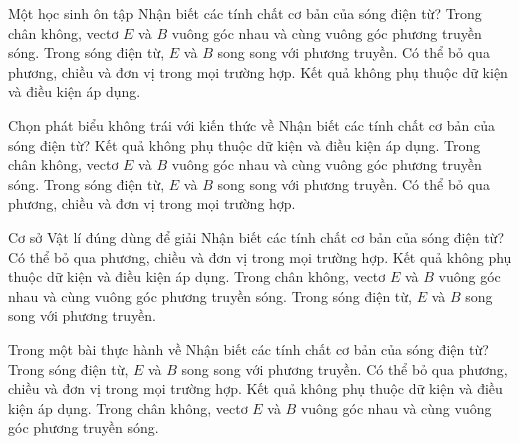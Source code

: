 \begin{ex}
Một học sinh ôn tập Nhận biết các tính chất cơ bản của sóng điện từ?
\choice
{\True Trong chân không, vectơ $E$ và $B$ vuông góc nhau và cùng vuông góc phương truyền sóng.}
{Trong sóng điện từ, $E$ và $B$ song song với phương truyền.}
{Có thể bỏ qua phương, chiều và đơn vị trong mọi trường hợp.}
{Kết quả không phụ thuộc dữ kiện và điều kiện áp dụng.}
\end{ex}

\begin{ex}
Chọn phát biểu không trái với kiến thức về Nhận biết các tính chất cơ bản của sóng điện từ?
\choice
{Kết quả không phụ thuộc dữ kiện và điều kiện áp dụng.}
{\True Trong chân không, vectơ $E$ và $B$ vuông góc nhau và cùng vuông góc phương truyền sóng.}
{Trong sóng điện từ, $E$ và $B$ song song với phương truyền.}
{Có thể bỏ qua phương, chiều và đơn vị trong mọi trường hợp.}
\end{ex}

\begin{ex}
Cơ sở Vật lí đúng dùng để giải Nhận biết các tính chất cơ bản của sóng điện từ?
\choice
{Có thể bỏ qua phương, chiều và đơn vị trong mọi trường hợp.}
{Kết quả không phụ thuộc dữ kiện và điều kiện áp dụng.}
{\True Trong chân không, vectơ $E$ và $B$ vuông góc nhau và cùng vuông góc phương truyền sóng.}
{Trong sóng điện từ, $E$ và $B$ song song với phương truyền.}
\end{ex}

\begin{ex}
Trong một bài thực hành về Nhận biết các tính chất cơ bản của sóng điện từ?
\choice
{Trong sóng điện từ, $E$ và $B$ song song với phương truyền.}
{Có thể bỏ qua phương, chiều và đơn vị trong mọi trường hợp.}
{Kết quả không phụ thuộc dữ kiện và điều kiện áp dụng.}
{\True Trong chân không, vectơ $E$ và $B$ vuông góc nhau và cùng vuông góc phương truyền sóng.}
\end{ex}

